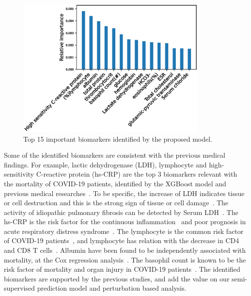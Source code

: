 \begin{figure}[h]
    \raggedright
    \includegraphics[width=0.85\textwidth]{figures/identified-features.eps}
    \caption{Top 15 important biomarkers identified by the proposed model.} \label{fig: identified-features}
\end{figure}
Some of the identified biomarkers are consistent with the previous medical findings. For example, lactic dehydrogenase (LDH), lymphocyte and high-sensitivity C-reactive protein (hs-CRP) are the top 3 biomarkers relevant with the mortality of COVID-19 patients, identified by the XGBoost model \cite{yan2020interpretable} and previous medical researches~\cite{kishaba2014staging,ridker2008rosuvastatin,wang2020clinical}. %
To be specific, the increase of LDH indicates tissue or cell destruction and this is the strong sign of tissue or cell damage~\cite{yan2020interpretable}. The activity of idiopathic pulmonary fibrosis can be detected by Serum LDH~\cite{kishaba2014staging}. The hs-CRP is the risk factor for the continuous inflammation~\cite{bajwa2009plasma} and poor prognosis in acute respiratory distress syndrome~\cite{kishaba2014staging,sharma2016aetiology}. The lymphocyte is the common risk factor of COVID-19 patients~\cite{chan2020familial}, and lymphocyte has relation with the decrease in CD4 and CD8 T cells~\cite{liu2020longitudinal}.
Albumin have been found to be independently associated with mortality, at the Cox regression analysis~\cite{violi2020albumin}. The basophil count is known to be the risk factor of mortality and organ injury in COVID-19 patients~\cite{li2020immune}. The identified biomarkers are supported by the previous studies, and add the value on our semi-supervised prediction model and perturbation based analysis.

